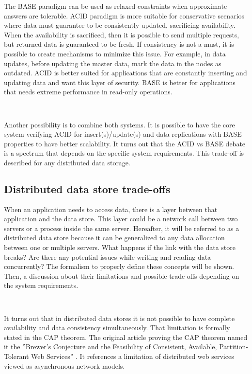 \documentclass[12pt,english]{article} %
\begin{document}
The BASE paradigm can be used as relaxed constraints when approximate answers are tolerable.
ACID paradigm is more suitable for conservative scenarios where data must guarantee to be consistently updated, sacrificing availability.
When the availability is sacrificed, then it is possible to send multiple requests, but returned data is guaranteed to be fresh.
If consistency is not a must, it is possible to create mechanisms to minimize this issue.
For example, in data updates, before updating the master data, mark the data in the nodes as outdated.
ACID is better suited for applications that are constantly inserting and updating data and want this layer of security.
BASE is better for applications that needs extreme performance in read-only operations.

\

Another possibility is to combine both systems.
It is possible to have the core system verifying ACID for insert(s)/update(s) and data replications with BASE properties to have better scalability.
It turns out that the ACID vs BASE debate is a spectrum that depends on the specific system requirements.
This trade-off is described for any distributed data storage.

\subsection{Distributed data store trade-offs}
When an application needs to access data, there is a layer between that application and the data store.
This layer could be a network call between two servers or a process inside the same server.
Hereafter, it will be referred to as a distributed data store because it can be generalized to any data allocation between one or multiple servers.
What happens if the link with the data store breaks?
Are there any potential issues while writing and reading data concurrently?
The formalism to properly define these concepts will be shown.
Then, a discussion about their limitations and possible trade-offs depending on the system requirements.

\

It turns out that in distributed data stores it is not possible to have complete availability and data consistency simultaneously.
That limitation is formally stated in the CAP theorem.
The original article proving the CAP theorem named it the ''Brewer's Conjecture and the Feasibility of Consistent, Available, Partition-Tolerant Web Services'' \cite{brewer-conjecture-cap}.
It references a limitation of distributed web services viewed as asynchronous network models.
\end{document}
